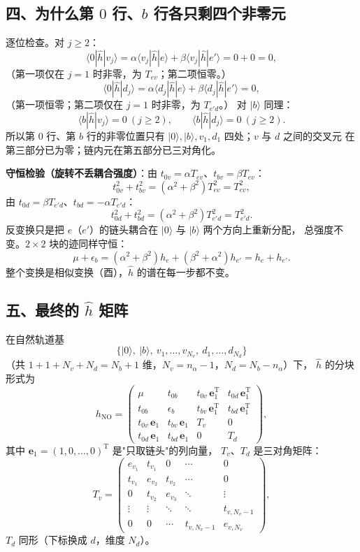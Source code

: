 \documentclass[11pt]{ctexart}
\begin{document}
\subsection{四、为什么第 $0$ 行、$b$ 行各只剩四个非零元}

逐位检查。对 $j\ge2$：
\[
\langle0|\hat h|v_j\rangle
=
\alpha\langle v_j|\hat h|e\rangle+\beta\langle v_j|\hat h|e'\rangle
=
0+0=0 ,
\]
（第一项仅在 $j=1$ 时非零，为 $T_{ev}$；第二项恒零。）
\[
\langle0|\hat h|d_j\rangle
=
\alpha\langle d_j|\hat h|e\rangle+\beta\langle d_j|\hat h|e'\rangle
=
0 ,
\]
（第一项恒零；第二项仅在 $j=1$ 时非零，为 $T_{e'd}$。）
对 $|b\rangle$ 同理：
\[
\langle b|\hat h|v_j\rangle=0\ (j\ge2),\qquad
\langle b|\hat h|d_j\rangle=0\ (j\ge2) .
\]
所以第 $0$ 行、第 $b$ 行的非零位置只有
$|0\rangle,|b\rangle,v_1,d_1$ 四处；$v$ 与 $d$ 之间的交叉元
在第三部分已为零；链内元在第五部分已三对角化。

\textbf{守恒检验（旋转不丢耦合强度）}：由 $t_{0v}=\alpha T_{ev}$、$t_{bv}=\beta T_{ev}$：
\[
t_{0v}^2+t_{bv}^2=(\alpha^2+\beta^2)T_{ev}^2=T_{ev}^2 ,
\]
由 $t_{0d}=\beta T_{e'd}$、$t_{bd}=-\alpha T_{e'd}$：
\[
t_{0d}^2+t_{bd}^2=(\alpha^2+\beta^2)T_{e'd}^2=T_{e'd}^2 .
\]
反变换只是把 $e$（$e'$）的链头耦合在 $|0\rangle$ 与 $|b\rangle$ 两个方向上重新分配，
总强度不变。$2\times2$ 块的迹同样守恒：
\[
\mu+\epsilon_b=(\alpha^2+\beta^2)h_e+(\beta^2+\alpha^2)h_{e'}=h_e+h_{e'} .
\]
整个变换是相似变换（酉），$\hat h$ 的谱在每一步都不变。

\subsection{五、最终的 $\hat h$ 矩阵}

在自然轨道基
\[
\big\{|0\rangle,\ |b\rangle,\ v_1,\dots,v_{N_v},\ d_1,\dots,d_{N_d}\big\}
\]
（共 $1+1+N_v+N_d=N_b+1$ 维，$N_v=n_\alpha-1$，$N_d=N_b-n_\alpha$）下，
$\hat h$ 的分块形式为
\[
h_{\mathrm{NO}}
=
\begin{pmatrix}
\mu & t_{0b} & t_{0v}\,\mathbf e_1^{\mathrm T} & t_{0d}\,\mathbf e_1^{\mathrm T}\\[4pt]
t_{0b} & \epsilon_b & t_{bv}\,\mathbf e_1^{\mathrm T} & t_{bd}\,\mathbf e_1^{\mathrm T}\\[4pt]
t_{0v}\,\mathbf e_1 & t_{bv}\,\mathbf e_1 & T_v & 0\\[4pt]
t_{0d}\,\mathbf e_1 & t_{bd}\,\mathbf e_1 & 0 & T_d
\end{pmatrix} ,
\]
其中 $\mathbf e_1=(1,0,\dots,0)^{\mathrm T}$ 是"只取链头"的列向量，
$T_v$、$T_d$ 是三对角矩阵：
\[
T_v=
\begin{pmatrix}
e_{v_1} & t_{v_1} & 0 & \cdots & 0\\
t_{v_1} & e_{v_2} & t_{v_2} & \cdots & 0\\
0 & t_{v_2} & e_{v_3} & \ddots & \vdots\\
\vdots & \vdots & \ddots & \ddots & t_{v,N_v-1}\\
0 & 0 & \cdots & t_{v,N_v-1} & e_{v,N_v}
\end{pmatrix} ,
\]
$T_d$ 同形（下标换成 $d$，维度 $N_d$）。
\end{document}
